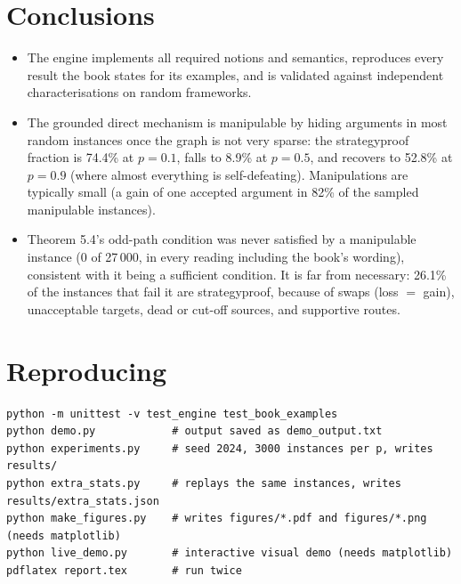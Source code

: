 \documentclass[11pt,a4paper]{article}
\begin{document}
\section{Conclusions}
\begin{itemize}
\item The engine implements all required notions and semantics, reproduces every result the book states for its examples, and is
  validated against independent characterisations on random frameworks.
\item The grounded direct mechanism is manipulable by hiding arguments in most random instances once the graph is not very sparse:
  the strategyproof fraction is 74.4\% at $p=0.1$, falls to 8.9\% at $p=0.5$, and recovers to 52.8\% at $p=0.9$ (where almost
  everything is self-defeating). Manipulations are typically small (a gain of one accepted argument in 82\% of the sampled
  manipulable instances).
\item Theorem 5.4's odd-path condition was never satisfied by a manipulable instance (0 of 27\,000, in every reading including the
  book's wording), consistent with it being a sufficient condition. It is far from necessary: 26.1\% of the instances that fail it
  are strategyproof, because of swaps (loss $=$ gain), unacceptable targets, dead or cut-off sources, and supportive routes.
\end{itemize}

\section{Reproducing}
\begin{verbatim}
python -m unittest -v test_engine test_book_examples
python demo.py            # output saved as demo_output.txt
python experiments.py     # seed 2024, 3000 instances per p, writes results/
python extra_stats.py     # replays the same instances, writes results/extra_stats.json
python make_figures.py    # writes figures/*.pdf and figures/*.png (needs matplotlib)
python live_demo.py       # interactive visual demo (needs matplotlib)
pdflatex report.tex       # run twice
\end{verbatim}
\end{document}
